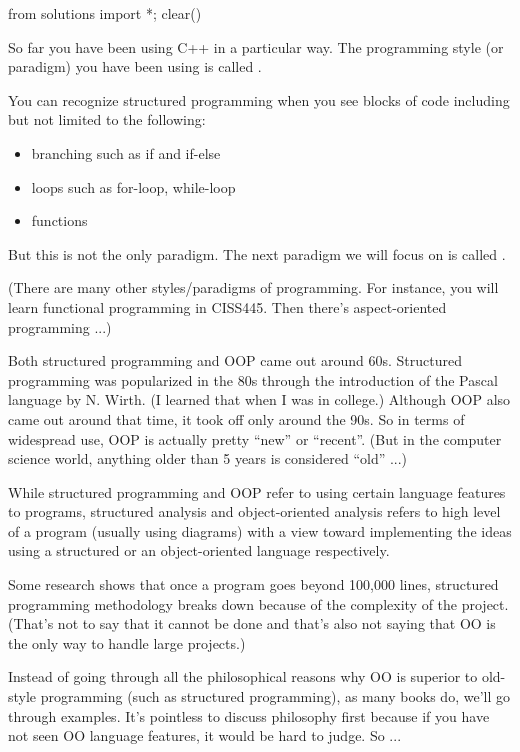 \begin{python0}
from solutions import *; clear()
\end{python0}

So far you have been using C++ in a particular way. The programming
style (or paradigm) you have been using is called .

You can recognize structured programming when you see blocks of code
including but not limited to the following:

\begin{itemize}
\item branching such as if and if-else
\item loops such as for-loop, while-loop
\item functions
\end{itemize}

But this is not the only paradigm. The next paradigm we will focus on is
called .

(There are many other styles/paradigms of programming. For instance, you
will learn functional programming in CISS445. Then
there's aspect-oriented programming ...)

Both structured programming and OOP came out around 60s. Structured
programming was popularized in the 80s through the introduction of the
Pascal language by N. Wirth. (I learned that when I was in college.)
Although OOP also came out around that time, it took off only around the
90s. So in terms of widespread use, OOP is actually pretty ``new'' or
``recent''. (But in the computer science world, anything older than 5
years is considered ``old'' ...)

While structured programming and OOP refer to using certain language
features to  programs, structured analysis and
object-oriented analysis refers to high level  of a
program (usually using diagrams) with a view toward implementing the
ideas using a structured or an object-oriented language respectively.

Some research shows that once a program goes beyond 100,000 lines,
structured programming methodology breaks down because of the complexity
of the project. (That's not to say that it cannot be
done and that's also not saying that OO is the only way
to handle large projects.)

Instead of going through all the philosophical reasons why OO is
superior to old-style programming (such as structured programming), as
many books do, we'll go through examples. It's pointless
to discuss philosophy first because if you have not seen OO language
features, it would be hard to judge. So ...


